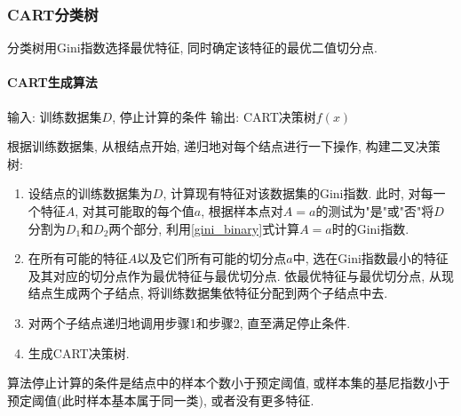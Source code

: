\subsubsection{CART分类树}

分类树用Gini指数选择最优特征, 同时确定该特征的最优二值切分点.

\paragraph{CART生成算法}

输入: 训练数据集$D$, 停止计算的条件
输出: CART决策树$f(x)$

根据训练数据集, 从根结点开始, 递归地对每个结点进行一下操作, 构建二叉决策树:

\begin{enumerate}
    \item 设结点的训练数据集为$D$, 计算现有特征对该数据集的Gini指数. 此时, 对每一个特征$A$, 对其可能取的每个值$a$, 根据样本点对$A = a$的测试为"是"或"否"将$D$分割为$D_1$和$D_2$两个部分, 利用\ref{gini_binary}式计算$A=a$时的Gini指数.
    \item 在所有可能的特征$A$以及它们所有可能的切分点$a$中, 选在Gini指数最小的特征及其对应的切分点作为最优特征与最优切分点. 依最优特征与最优切分点, 从现结点生成两个子结点, 将训练数据集依特征分配到两个子结点中去.
    \item 对两个子结点递归地调用步骤1和步骤2, 直至满足停止条件.
    \item 生成CART决策树.
\end{enumerate}

\begin{remark}
    算法停止计算的条件是结点中的样本个数小于预定阈值, 或样本集的基尼指数小于预定阈值(此时样本基本属于同一类), 或者没有更多特征.
\end{remark}